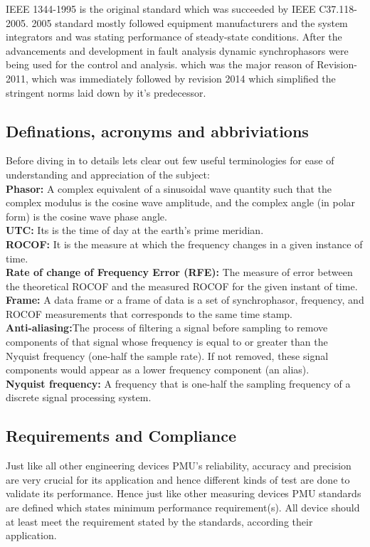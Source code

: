 IEEE 1344-1995 is the original standard which was succeeded by IEEE C37.118-2005. 2005 standard mostly followed equipment manufacturers and the system integrators and was stating performance of steady-state conditions. After the advancements and development in fault analysis dynamic synchrophasors were being used for the control and analysis.  which was the major reason of Revision-2011, which was immediately followed by revision 2014 which simplified the stringent norms laid down by it's predecessor.

\subsection{Definations, acronyms and abbriviations}

Before diving in to details lets clear out few useful terminologies for ease of understanding and appreciation of the subject:\\
\textbf{Phasor:} A complex equivalent of a sinusoidal wave quantity such that the complex modulus is the cosine wave amplitude, and the complex angle (in polar form) is the cosine wave phase angle.\\
\textbf{UTC:} Its is the time of day at the earth's prime meridian.\\
\textbf{ROCOF:} It is the measure at which the frequency changes in a given instance of time.\\
\textbf{Rate of change of Frequency Error (RFE):} The measure of error between the theoretical ROCOF and the measured ROCOF for the given instant of time.\\
\textbf{Frame:} A data frame or a frame of data is a set of synchrophasor, frequency, and ROCOF measurements that corresponds to the same time stamp.\\
\textbf{Anti-aliasing:}The process of filtering a signal before sampling to remove components of that signal whose frequency is equal to or greater than the Nyquist frequency (one-half the sample rate). If not removed, these signal components would appear as a lower frequency component (an alias).\\
\textbf{Nyquist frequency:} A frequency that is one-half the sampling frequency of a discrete signal processing
system.\\

\subsection{Requirements and Compliance}
Just like all other engineering devices PMU's reliability, accuracy  and precision are very crucial for its application and hence different kinds of test are done to validate its performance. Hence just like other measuring devices PMU standards are defined which states minimum performance requirement(s). All device should at least meet the requirement stated by the standards, according their application.


